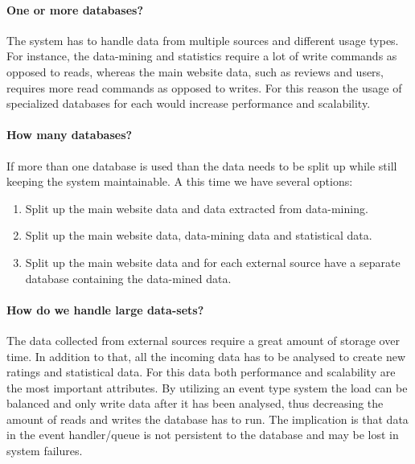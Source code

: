 \documentclass{article}
\begin{document}
\paragraph{One or more databases?}
The system has to handle data from multiple sources and different usage types. For instance, the data-mining and statistics require a lot of write commands as opposed to reads, whereas the main website data, such as reviews and users, requires more read commands as opposed to writes. For this reason the usage of specialized databases for each would increase performance and scalability.

\paragraph{How many databases?}
If more than one database is used than  the data needs to be split up while still keeping the system maintainable. 
A this time we have several options:
\begin{enumerate}
\item Split up the main website data and data extracted from data-mining.
\item Split up the main website data, data-mining data and statistical data.
\item Split up the main website data and for each external source have a separate database containing the data-mined data.
\end{enumerate}

\paragraph{How do we handle large data-sets?}
The data collected from external sources require a great amount of storage over time. In addition to that, all the incoming data has to be analysed to create new ratings and statistical data. For this data both performance and scalability are the most important attributes.
By utilizing an event type system the load can be balanced and only write data after it has been analysed, thus decreasing the amount of reads and writes the database has to run. The implication is that data in the event handler/queue is not persistent to the database and may be lost in system failures.
\end{document}
